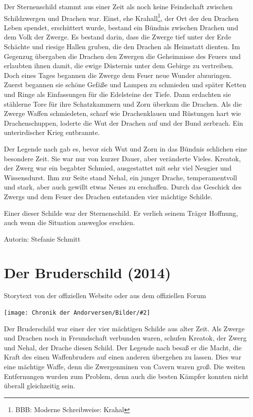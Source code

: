 \documentclass[10pt, a4paper, oneside]{book}
\newcommand{\fillbreak}{\vspace*{\fill}\columnbreak}
\newcommand{\storytext}[1]{%
    \section{#1}%
    \label{Storytext: #1}%
}
\newcommand{\bildmitts}[2][height=0.32\textwidth,width=0.48\textwidth,keepaspectratio]{%
    \begin{center}
        \texttt{[image: Chronik der Andorversen/Bilder/\#2]}
    \end{center}
}
\begin{document}
\begin{multicols}{2}
Der Sternenschild stammt aus einer Zeit als noch keine Feindschaft zwischen Schildzwergen und Drachen war. Einst, ehe Krahall\footnote{BBB: Moderne Schreibweise: Krahal}, der Ort der den Drachen Leben spendet, erschüttert wurde, bestand ein Bündnis zwischen Drachen und dem Volk der Zwerge. Es bestand darin, dass die Zwerge tief unter der Erde Schächte und riesige Hallen gruben, die den Drachen als Heimstatt dienten. Im Gegenzug übergaben die Drachen den Zwergen die Geheimnisse des Feuers und erlaubten ihnen damit, die ewige Düsternis unter dem Gebirge zu vertreiben. Doch eines Tages begannen die Zwerge dem Feuer neue Wunder abzuringen. Zuerst begannen sie schöne Gefäße und Lampen zu schmieden und später Ketten und Ringe als Einfassungen für die Edelsteine der Tiefe. Dann erdachten sie stählerne Tore für ihre Schatzkammern und Zorn überkam die Drachen. Als die Zwerge Waffen schmiedeten, scharf wie Drachenklauen und Rüstungen hart wie Drachenschuppen, loderte die Wut der Drachen auf und der Bund zerbrach. Ein unterirdischer Krieg entbrannte.\bigskip

Der Legende nach gab es, bevor sich Wut und Zorn in das Bündnis schlichen eine besondere Zeit. Sie war nur von kurzer Dauer, aber veränderte Vieles. Kreatok, der Zwerg war ein begabter Schmied, ausgestattet mit sehr viel Neugier und Wissensdurst. Ihm zur Seite stand Nehal, ein junger Drache, temperamentvoll und stark, aber auch gewillt etwas Neues zu erschaffen. Durch das Geschick des Zwergs und dem Feuer des Drachen entstanden vier mächtige Schilde.\bigskip

Einer dieser Schilde war der Sternenschild. Er verlieh seinem Träger Hoffnung, auch wenn die Situation ausweglos erschien.\bigskip

Autorin: Stefanie Schmitt





\fillbreak
\storytext{Der Bruderschild (2014)}

\begin{center}
    Storytext von der offiziellen Website oder aus dem offiziellen Forum
\end{center}

\bildmitts{Der Bruderschild Bild 1.jpg}

Der Bruderschild war einer der vier mächtigen Schilde aus alter Zeit. Als Zwerge und Drachen noch in Freundschaft verbunden waren, schufen Kreatok, der Zwerg und Nehal, der Drache diesen Schild. Der Legende nach besaß er die Macht, die Kraft des einen Waffenbruders auf einen anderen übergehen zu lassen. Dies war eine mächtige Waffe, denn die Zwergenminen von Cavern waren groß. Die weiten Entfernungen wurden zum Problem, denn auch die besten Kämpfer konnten nicht überall gleichzeitig sein.


\end{multicols}
\end{document}
